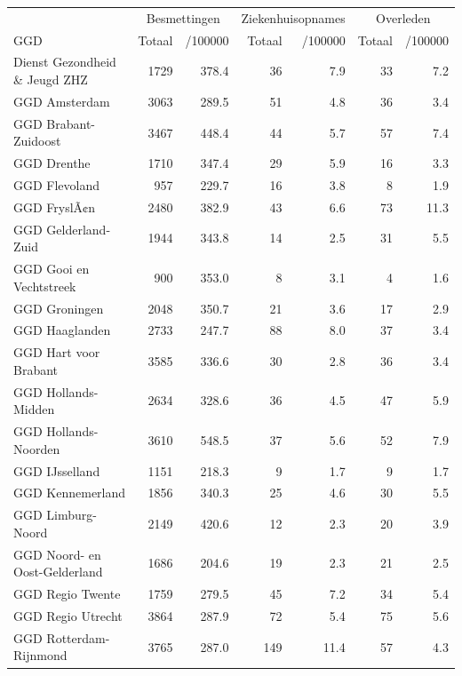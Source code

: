 \documentclass[
  english,
  man,floatsintext]{apa6}
\begin{document}
\begin{table}[H]
\centering\begingroup\fontsize{10}{12}\selectfont

\begin{threeparttable}
\begin{tabular}{lrrrrrr}
\toprule
\multicolumn{1}{c}{ } & \multicolumn{2}{c}{Besmettingen} & \multicolumn{2}{c}{Ziekenhuisopnames} & \multicolumn{2}{c}{Overleden} \\
\cmidrule(l{3pt}r{3pt}){2-3} \cmidrule(l{3pt}r{3pt}){4-5} \cmidrule(l{3pt}r{3pt}){6-7}
GGD & Totaal & /100000 & Totaal & /100000 & Totaal & /100000\\
\midrule
Dienst Gezondheid \& Jeugd ZHZ & 1729 & 378.4 & 36 & 7.9 & 33 & 7.2\\
GGD Amsterdam & 3063 & 289.5 & 51 & 4.8 & 36 & 3.4\\
GGD Brabant-Zuidoost & 3467 & 448.4 & 44 & 5.7 & 57 & 7.4\\
GGD Drenthe & 1710 & 347.4 & 29 & 5.9 & 16 & 3.3\\
GGD Flevoland & 957 & 229.7 & 16 & 3.8 & 8 & 1.9\\
GGD FryslÃ¢n & 2480 & 382.9 & 43 & 6.6 & 73 & 11.3\\
GGD Gelderland-Zuid & 1944 & 343.8 & 14 & 2.5 & 31 & 5.5\\
GGD Gooi en Vechtstreek & 900 & 353.0 & 8 & 3.1 & 4 & 1.6\\
GGD Groningen & 2048 & 350.7 & 21 & 3.6 & 17 & 2.9\\
GGD Haaglanden & 2733 & 247.7 & 88 & 8.0 & 37 & 3.4\\
GGD Hart voor Brabant & 3585 & 336.6 & 30 & 2.8 & 36 & 3.4\\
GGD Hollands-Midden & 2634 & 328.6 & 36 & 4.5 & 47 & 5.9\\
GGD Hollands-Noorden & 3610 & 548.5 & 37 & 5.6 & 52 & 7.9\\
GGD IJsselland & 1151 & 218.3 & 9 & 1.7 & 9 & 1.7\\
GGD Kennemerland & 1856 & 340.3 & 25 & 4.6 & 30 & 5.5\\
GGD Limburg-Noord & 2149 & 420.6 & 12 & 2.3 & 20 & 3.9\\
GGD Noord- en Oost-Gelderland & 1686 & 204.6 & 19 & 2.3 & 21 & 2.5\\
GGD Regio Twente & 1759 & 279.5 & 45 & 7.2 & 34 & 5.4\\
GGD Regio Utrecht & 3864 & 287.9 & 72 & 5.4 & 75 & 5.6\\
GGD Rotterdam-Rijnmond & 3765 & 287.0 & 149 & 11.4 & 57 & 4.3\\

\end{tabular}
\end{threeparttable}
\end{table}
\end{document}
